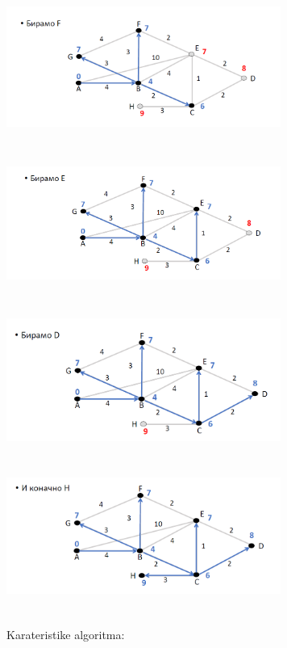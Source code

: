 \documentclass{article} %
\begin{document}
\begin{center}
		\includegraphics[width=9cm, height=5cm]{da6}\\
		\includegraphics[width=9cm, height=5cm]{da7}\\
		\includegraphics[width=9cm, height=5cm]{da8}\\
		\includegraphics[width=9cm, height=5cm]{da9}\\
		
	\end{center}
\vskip 2cm
Karateristike algoritma:
\end{document}

